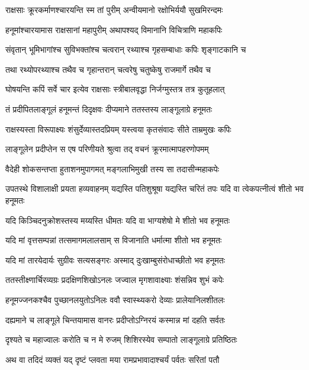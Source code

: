 \twolineshloka
{राक्षसाः क्रूरकर्माणश्चारयन्ति स्म तां पुरीम्}
{अन्वीयमानो रक्षोभिर्ययौ सुखमिरन्दमः} %

\twolineshloka
{हनूमांश्चारयामास राक्षसानां महापुरीम्}
{अथापश्यद् विमानानि विचित्राणि महाकपिः} %

\twolineshloka
{संवृतान् भूमिभागांश्च सुविभक्तांश्च चत्वरान्}
{रथ्याश्च गृहसम्बाधाः कपिः शृङ्गाटकानि च} %

\twolineshloka
{तथा रथ्योपरथ्याश्च तथैव च गृहान्तरान्}
{चत्वरेषु चतुष्केषु राजमार्गे तथैव च} %

\twolineshloka
{घोषयन्ति कपिं सर्वे चार इत्येव राक्षसाः}
{स्त्रीबालवृद्धा निर्जग्मुस्तत्र तत्र कुतूहलात्} %

\twolineshloka
{तं प्रदीपितलाङ्गूलं हनूमन्तं दिदृक्षवः}
{दीप्यमाने ततस्तस्य लाङ्गूलाग्रे हनूमतः} %

\twolineshloka
{राक्षस्यस्ता विरूपाक्ष्यः शंसुर्देव्यास्तदप्रियम्}
{यस्त्वया कृतसंवादः सीते ताम्रमुखः कपिः} %

\twolineshloka
{लाङ्गूलेन प्रदीप्तेन स एष परिणीयते}
{श्रुत्वा तद् वचनं क्रूरमात्मापहरणोपमम्} %

\twolineshloka
{वैदेही शोकसन्तप्ता हुताशनमुपागमत्}
{मङ्गलाभिमुखी तस्य सा तदासीन्महाकपेः} %

\threelineshloka
{उपतस्थे विशालाक्षी प्रयता हव्यवाहनम्}
{यद्यस्ति पतिशुश्रूषा यद्यस्ति चरितं तपः}
{यदि वा त्वेकपत्नीत्वं शीतो भव हनूमतः} %

\twolineshloka
{यदि किञ्चिदनुक्रोशस्तस्य मय्यस्ति धीमतः}
{यदि वा भाग्यशेषो मे शीतो भव हनूमतः} %

\twolineshloka
{यदि मां वृत्तसम्पन्नां तत्समागमलालसाम्}
{स विजानाति धर्मात्मा शीतो भव हनूमतः} %

\twolineshloka
{यदि मां तारयेदार्यः सुग्रीवः सत्यसङ्गरः}
{अस्माद् दुःखाम्बुसंरोधाच्छीतो भव हनूमतः} %

\twolineshloka
{ततस्तीक्ष्णार्चिरव्यग्रः प्रदक्षिणशिखोऽनलः}
{जज्वाल मृगशावाक्ष्याः शंसन्निव शुभं कपेः} %

\twolineshloka
{हनूमज्जनकश्चैव पुच्छानलयुतोऽनिलः}
{ववौ स्वास्थ्यकरो देव्याः प्रालेयानिलशीतलः} %

\twolineshloka
{दह्यमाने च लाङ्गूले चिन्तयामास वानरः}
{प्रदीप्तोऽग्निरयं कस्मान्न मां दहति सर्वतः} %

\twolineshloka
{दृश्यते च महाज्वालः करोति च न मे रुजम्}
{शिशिरस्येव सम्पातो लाङ्गूलाग्रे प्रतिष्ठितः} %

\twolineshloka
{अथ वा तदिदं व्यक्तं यद् दृष्टं प्लवता मया}
{रामप्रभावादाश्चर्यं पर्वतः सरितां पतौ} %

